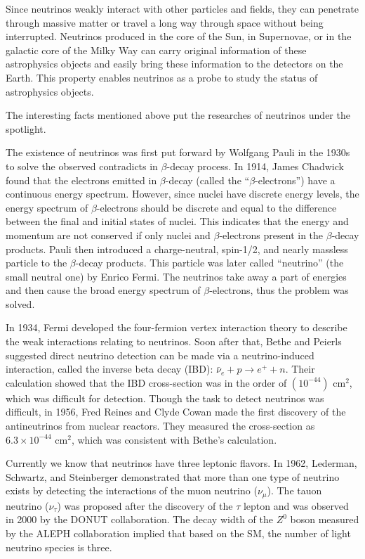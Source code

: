 Since neutrinos weakly interact with other particles and fields, they can penetrate through massive matter or travel a long way through space without being interrupted. Neutrinos produced in the core of the Sun, in Supernovae, or in the galactic core of the Milky Way can carry original information of these astrophysics objects and easily bring these information to the detectors on the Earth. This property enables neutrinos as a probe to study the status of astrophysics objects.

The interesting facts mentioned above put the researches of neutrinos under the spotlight. 

The existence of neutrinos was first put forward by Wolfgang Pauli in the 1930s to solve the observed contradicts in $\beta$-decay process. In 1914, James Chadwick found that the electrons emitted in $\beta$-decay (called the ``$\beta$-electrons'') have a continuous energy spectrum\cite{leite1996weak}. However, since nuclei have discrete energy levels, the energy spectrum of $\beta$-electrons should be discrete and equal to the difference between the final and initial states of nuclei. This indicates that the energy and momentum are not conserved if only nuclei and $\beta$-electrons present in the $\beta$-decay products. Pauli then introduced a charge-neutral, spin-1/2, and nearly massless particle to the $\beta$-decay products. This particle was later called ``neutrino'' (the small neutral one) by Enrico Fermi. The neutrinos take away a part of energies and then cause the broad energy spectrum of $\beta$-electrons, thus the problem was solved. 

In 1934, Fermi developed the four-fermion vertex interaction theory to describe the weak interactions relating to neutrinos. Soon after that, Bethe and Peierls suggested direct neutrino detection can be made via a neutrino-induced interaction, called the inverse beta decay (IBD): $\bar{\nu}_e+p\to e^+ + n$. Their calculation showed that the IBD cross-section was in the order of $(10^{-44})$ cm$^2$, which was difficult for detection\cite{bethe1934neutrino}. Though the task to detect neutrinos was difficult, in 1956, Fred Reines and Clyde Cowan made the first discovery of the antineutrinos from nuclear reactors. They measured the cross-section as $6.3\times10^{-44}$ cm$^2$, which was consistent with Bethe's calculation\cite{reines1960detection}.

Currently we know that neutrinos have three leptonic flavors. In 1962, Lederman, Schwartz, and Steinberger demonstrated that more than one type of neutrino exists by detecting the interactions of the muon neutrino ($\nu_\mu$)\cite{danby1962observation}. The tauon neutrino ($\nu_\tau$) was proposed after the discovery of the $\tau$ lepton and was observed in 2000 by the DONUT collaboration\cite{kodama2001observation}. The decay width of the $Z^0$ boson measured by the ALEPH collaboration implied that based on the SM, the number of light neutrino species is three\cite{decamp1989determination}.

